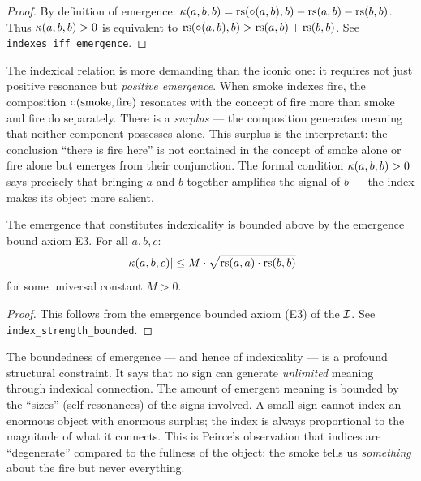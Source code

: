 \begin{proof}
By definition of emergence:
$\kappa(a, b, b) = \mathrm{rs}(\circ(a, b), b) - \mathrm{rs}(a, b) - \mathrm{rs}(b, b)$.
Thus $\kappa(a, b, b) > 0$ is equivalent to
$\mathrm{rs}(\circ(a, b), b) > \mathrm{rs}(a, b) + \mathrm{rs}(b, b)$. See
\texttt{indexes\_iff\_emergence}.
\end{proof}

\begin{interpretation}
The indexical relation is more demanding than the iconic one: it
requires not just positive resonance but \emph{positive emergence}.
When smoke indexes fire, the composition
$\circ(\text{smoke}, \text{fire})$ resonates with the concept of
fire more than smoke and fire do separately. There is a \emph{surplus}
--- the composition generates meaning that neither component possesses
alone. This surplus is the interpretant: the conclusion ``there is fire
here'' is not contained in the concept of smoke alone or fire alone but
emerges from their conjunction. The formal condition
$\kappa(a, b, b) > 0$ says precisely that bringing $a$ and $b$
together amplifies the signal of $b$ --- the index makes its object
more salient.
\end{interpretation}

\begin{theorem}
\label{thm:index-bounded}
The emergence that constitutes indexicality is bounded above by the
emergence bound axiom E3. For all $a, b, c$:
\[
  |\kappa(a, b, c)| \leq M \cdot \sqrt{\mathrm{rs}(a, a) \cdot \mathrm{rs}(b, b)}
\]
for some universal constant $M > 0$.
\end{theorem}

\begin{proof}
This follows from the emergence bounded axiom (E3) of the $\mathcal{I}$.
See \texttt{index\_strength\_bounded}.
\end{proof}

\begin{interpretation}
The boundedness of emergence --- and hence of indexicality --- is a
profound structural constraint. It says that no sign can generate
\emph{unlimited} meaning through indexical connection. The amount of
emergent meaning is bounded by the ``sizes'' (self-resonances) of the
signs involved. A small sign cannot index an enormous object with
enormous surplus; the index is always proportional to the magnitude of
what it connects. This is Peirce's observation that indices are
``degenerate'' compared to the fullness of the object: the smoke tells
us \emph{something} about the fire but never everything.
\end{interpretation}

